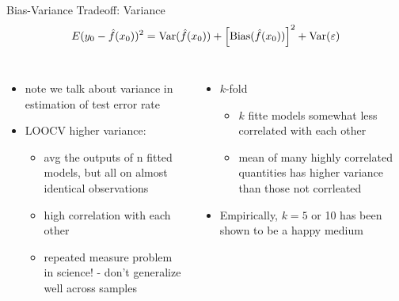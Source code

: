 \documentclass[aspectratio=169,usenames,dvipsnames]{beamer}
\newcommand{\InstructorList}[1]{
\begin{itemize}
	\color{orange}
	#1
\end{itemize}
}
\begin{document}
\begin{frame}[t]{Bias-Variance Tradeoff: Variance}
	\begin{equation*}
		E(y_0 - \hat f (x_0))^2 = \mathrm{Var}(\hat f (x_0))
			+ \left[\mathrm{Bias}(\hat f(x_0)) \right] ^2
			+ \mathrm{Var}(\varepsilon)
	\end{equation*}
\begin{columns}
\centering

\InstructorList{
\item note we talk about variance in estimation of test error rate

\item LOOCV higher variance:
\InstructorList{
	\item avg the outputs of n fitted models, but all on almost identical observations
	\item high correlation with each other
	\item repeated measure problem in science! - don't generalize well across samples
}

}

\centering
\InstructorList{
\item $k$-fold
\InstructorList{
	\item $k$ fitte models somewhat less correlated with each other
	\item mean of many highly correlated quantities has higher variance than those not corrleated
}
\item Empirically, $k=5$ or 10 has been shown to be a happy medium
}
\end{columns}

\end{frame}
\end{document}
